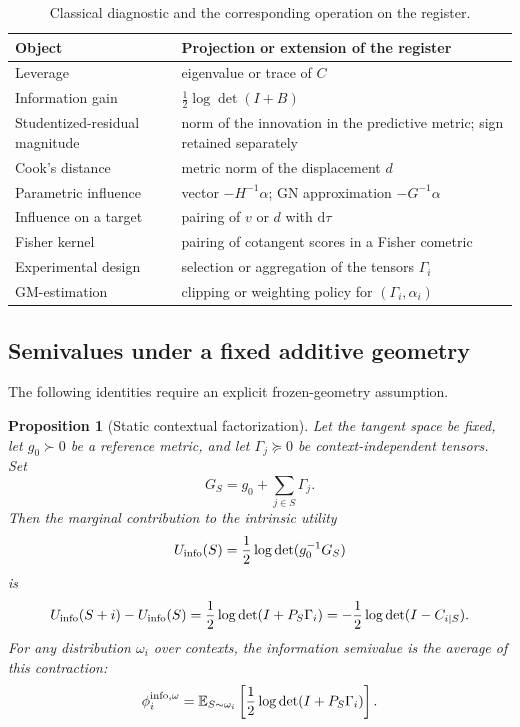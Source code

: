 \documentclass[10pt,a4paper]{article}
\newtheorem{proposition}[theorem]{Proposition}
\newcommand{\E}{\mathbb{E}}
\newcommand{\dd}{\mathrm d}
\begin{document}
\begin{table}[H]
\centering
\caption{Classical diagnostic and the corresponding operation on the register.}
\small
\begin{tabularx}{\textwidth}{@{}p{}X@{}}
\toprule
Object & Projection or extension of the register \\
\midrule
Leverage & eigenvalue or trace of $C$ \\
Information gain & $\tfrac12\log\det(I+B)$ \\
Studentized-residual magnitude & norm of the innovation in the predictive metric; sign retained separately \\
Cook's distance & metric norm of the displacement $d$ \\
Parametric influence & vector $-H^{-1}\alpha$; GN approximation $-G^{-1}\alpha$ \\
Influence on a target & pairing of $v$ or $d$ with $\dd\tau$ \\
Fisher kernel & pairing of cotangent scores in a Fisher cometric \\
Experimental design & selection or aggregation of the tensors $\Gamma_i$ \\
GM-estimation & clipping or weighting policy for $(\Gamma_i,\alpha_i)$ \\
\bottomrule
\end{tabularx}
\end{table}

\subsection{Semivalues under a fixed additive geometry}
The following identities require an explicit frozen-geometry assumption.

\begin{proposition}[Static contextual factorization]
Let the tangent space be fixed, let $g_0\succ0$ be a reference metric, and let $\Gamma_j\succeq0$ be context-independent tensors. Set
\[
G_S=g_0+\sum_{j\in S}\Gamma_j.
\]
Then the marginal contribution to the intrinsic utility
\[
U_{\rm info}(S)=\frac12\log\det(g_0^{-1}G_S)
\]
is
\begin{equation}
U_{\rm info}(S+i)-U_{\rm info}(S)
=
\frac12\log\det(I+P_S\Gamma_i)
=
-\frac12\log\det(I-C_{i\mid S}).
\label{eq:static-info-factor}
\end{equation}
For any distribution $\omega_i$ over contexts, the information semivalue is the average of this contraction:
\begin{equation}
\phi_i^{\rm info,\omega}
=
\E_{S\sim\omega_i}\left[\frac12\log\det(I+P_S\Gamma_i)\right].
\label{eq:semivalue-info}
\end{equation}
\end{proposition}
\end{document}
